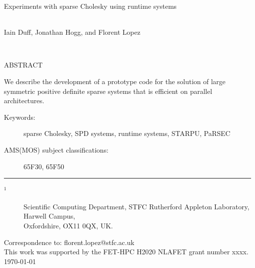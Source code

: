 \documentclass{article}
\newcommand{\stfccovertitle}
{Experiments with sparse Cholesky using runtime systems}
\newcommand{\theabstract}{We describe the development of a prototype code for 
the solution of large symmetric positive definite sparse systems that is
efficient on parallel architectures.
}
\begin{document}
\begin{titlepage}

\vspace*{-0.5cm}

\vspace{1.0 cm}

{\Large \bf
\begin{center}
   \stfccovertitle
\end{center}}

\begin{center}
\mbox{} \\
      Iain Duff\footnotemark[1], 
      Jonathan Hogg\footnotemark[1], and Florent Lopez\footnotemark[1]
     
\mbox{} \\
\end{center}

\vspace{1.0cm}


\noindent
{\large ABSTRACT}

\vspace{0.3cm}
\noindent
\theabstract

\vspace{0.6cm}

\begin{description}
\item [Keywords:] sparse Cholesky, SPD systems, runtime systems, STARPU, PaRSEC
\item [AMS(MOS) subject classifications:]  65F30, 65F50
\end{description}

\vspace{0.1 cm}

\noindent \rule{15cm}{0.001in}
\vspace{0.1 cm}

\begin{description}

\item [$^1$] Scientific Computing Department, STFC Rutherford 
Appleton Laboratory,
Harwell Campus,\\ Oxfordshire, OX11 0QX, UK.
\end{description}
\noindent
Correspondence to: florent.lopez@stfc.ac.uk\\
This work was supported by the FET-HPC H2020 NLAFET grant number xxxx.\\


\vspace{1.1 cm}
\noindent \today

\end{titlepage}
\end{document}
